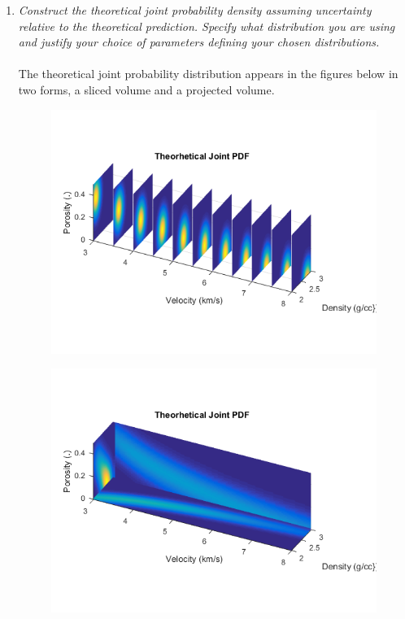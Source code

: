 \documentclass[12pt,runningheads]{article}
\begin{document}
\begin{enumerate}
\pagebreak
\item \textit{Construct the theoretical joint probability density assuming uncertainty relative to the theoretical prediction. Specify what distribution you are using and justify your choice of parameters defining your chosen distributions.}\\ \\
The theoretical joint probability distribution appears in the figures below in two forms, a sliced volume and a projected volume.

\begin{figure}[!h]
\includegraphics[width=\textwidth]{TheoryS.png}
\end{figure}
\begin{figure}[!h]
\includegraphics[width=\textwidth]{TheoryP.png}

\end{figure}
\end{enumerate}
\end{document}
